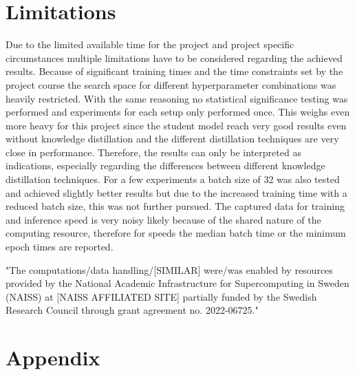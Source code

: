 \documentclass{article}
\begin{document}
\section{Limitations}
Due to the limited available time for the project and project specific circumstances multiple limitations have to be considered regarding the achieved results. Because of significant training times and the time constraints set by the project course the search space for different hyperparameter combinations was heavily restricted. With the same reasoning no statistical significance testing was performed and experiments for each setup only performed once. This weighs even more heavy for this project since the student model reach very good results even without knowledge distillation and the different distillation techniques are very close in performance. Therefore, the results can only be interpreted as indications, especially regarding the differences between different knowledge distillation techniques.
For a few experiments a batch size of $ 32 $ was also tested and achieved slightly better results but due to the increased training time with a reduced batch size, this was not further pursued.
The captured data for training and inference speed is very noisy likely because of the shared nature of the computing resource, therefore for speeds the median batch time or the minimum epoch times are reported.

\newpage
"The computations/data handling/[SIMILAR] were/was enabled by resources provided by the National Academic Infrastructure for Supercomputing in Sweden (NAISS) at [NAISS AFFILIATED SITE] partially funded by the Swedish Research Council through grant agreement no. 2022-06725."
\section*{Appendix}


\end{document}
